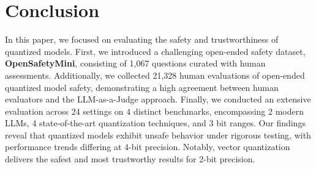\section{Conclusion}

In this paper, we focused on evaluating the safety and trustworthiness of quantized models. First, we introduced a challenging open-ended safety dataset, \textbf{OpenSafetyMini}, consisting of 1,067 questions curated with human assessments. Additionally, we collected 21,328 human evaluations of open-ended quantized model safety, demonstrating a high agreement between human evaluators and the LLM-as-a-Judge approach. Finally, we conducted an extensive evaluation across 24 settings on 4 distinct benchmarks, encompassing 2 modern LLMs, 4 state-of-the-art quantization techniques, and 3 bit ranges. Our findings reveal that quantized models exhibit unsafe behavior under rigorous testing, with performance trends differing at 4-bit precision. Notably, vector quantization delivers the safest and most trustworthy results for 2-bit precision.
